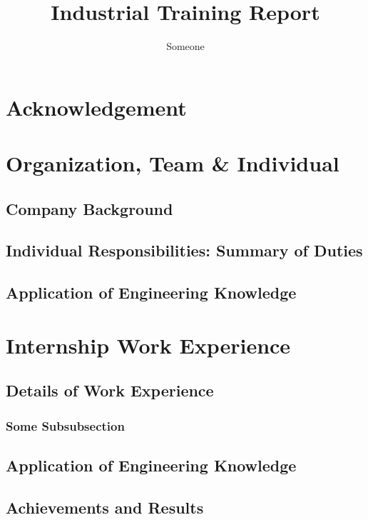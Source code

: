\documentclass[12pt]{article}
\title{Industrial Training Report}
\author{Someone}
\begin{document}
\maketitle

\section*{Acknowledgement}

\clearpage

\tableofcontents

\clearpage

\section{Organization, Team \& Individual}
\subsection{Company Background}    
\subsection{Individual Responsibilities: Summary of Duties}
\subsection{Application of Engineering Knowledge}

\clearpage

\section{Internship Work Experience}
\subsection{Details of Work Experience}
\subsubsection*{Some Subsubsection}
\subsection{Application of Engineering Knowledge}
\subsection{Achievements and Results}
\end{document}
